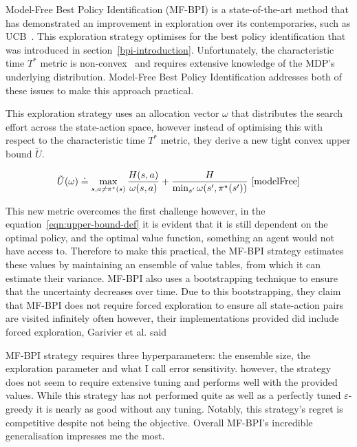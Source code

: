 \documentclass[]{final_report}
\begin{document}
Model-Free Best Policy Identification (MF-BPI) is a state-of-the-art method that has demonstrated an improvement in exploration over its contemporaries, such as UCB~\cite{modelFree}. This exploration strategy optimises for the best policy identification that was introduced in section~\ref{bpi-introduction}. Unfortunately, the characteristic time $T^*$ metric is non-convex~\cite{characteristicTimeNonConvex} and requires extensive knowledge of the MDP's underlying distribution. Model-Free Best Policy Identification addresses both of these issues to make this approach practical.

This exploration strategy uses an allocation vector $\omega$ that distributes the search effort across the state-action space, however instead of optimising this with respect to the characteristic time $T^*$ metric, they derive a new tight convex upper bound $\tilde{U}$. 

\begin{equation}
  \tilde{U}(\omega) \doteq \max_{s,a \neq \pi^\star(s)} \frac{H(s,a)}{\omega(s,a)} + \frac{H}{\min_{s'} \omega(s',\pi^\star(s'))}~\cite{modelFree} \label{eqn:upper-bound-def}
\end{equation}


This new metric overcomes the first challenge however, in the equation~\ref{eqn:upper-bound-def} it is evident that it is still dependent on the optimal policy, and the optimal value function, something an agent would not have access to. Therefore to make this practical, the MF-BPI strategy estimates these values by maintaining an ensemble of value tables, from which it can estimate their variance. MF-BPI also uses a bootstrapping technique to ensure that the uncertainty decreases over time. Due to this bootstrapping, they claim that MF-BPI does not require forced exploration to ensure all state-action pairs are visited infinitely often however, their implementations provided did include forced exploration, Garivier et al. said ~\cite{characteristicTime}

MF-BPI strategy requires three hyperparameters: the ensemble size, the exploration parameter and what I call error sensitivity. however, the strategy does not seem to require extensive tuning and performs well with the provided values. While this strategy has not performed quite as well as a perfectly tuned $\varepsilon$-greedy it is nearly as good without any tuning. Notably, this strategy's regret is competitive despite not being the objective. Overall MF-BPI's incredible generalisation impresses me the most.
\end{document}
